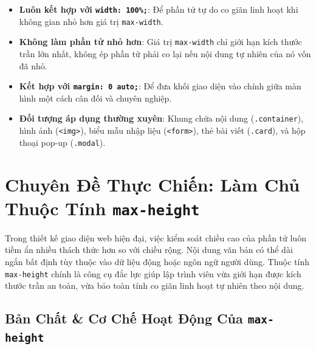 \documentclass[11pt,oneside]{book}
\newcommand{\codeinline}[1]{\textcolor{accentOrange}{\texttt{#1}}}
\DeclareRobustCommand{\csshint}[1]{\texorpdfstring{\textcolor{accentOrange}{\textbf{\texttt{#1}}}}{#1}}
\begin{document}
\begin{tipBox}
\begin{itemize}[leftmargin=1.5em, itemsep=2.5pt, parsep=0pt]
    \item \textbf{Luôn kết hợp với \codeinline{width: 100\%;}}: Để phần tử tự do co giãn linh hoạt khi không gian nhỏ hơn giá trị \codeinline{max-width}.
    \item \textbf{Không làm phần tử nhỏ hơn}: Giá trị \codeinline{max-width} chỉ giới hạn kích thước trần lớn nhất, không ép phần tử phải co lại nếu nội dung tự nhiên của nó vốn đã nhỏ.
    \item \textbf{Kết hợp với \codeinline{margin: 0 auto;}}: Để đưa khối giao diện vào chính giữa màn hình một cách cân đối và chuyên nghiệp.
    \item \textbf{Đối tượng áp dụng thường xuyên}: Khung chứa nội dung (\codeinline{.container}), hình ảnh (\codeinline{<img>}), biểu mẫu nhập liệu (\codeinline{<form>}), thẻ bài viết (\codeinline{.card}), và hộp thoại pop-up (\codeinline{.modal}).
\end{itemize}
\end{tipBox}

\clearpage
\section{Chuyên Đề Thực Chiến: Làm Chủ Thuộc Tính \csshint{max-height}}
\label{sec:max_height_masterclass}

Trong thiết kế giao diện web hiện đại, việc kiểm soát chiều cao của phần tử luôn tiềm ẩn nhiều thách thức hơn so với chiều rộng. Nội dung văn bản có thể dài ngắn bất định tùy thuộc vào dữ liệu động hoặc ngôn ngữ người dùng. Thuộc tính \codeinline{max-height} chính là công cụ đắc lực giúp lập trình viên vừa giới hạn được kích thước trần an toàn, vừa bảo toàn tính co giãn linh hoạt tự nhiên theo nội dung.

\subsection{Bản Chất \& Cơ Chế Hoạt Động Của \csshint{max-height}}
\label{subsec:max_height_concept}
\end{document}
